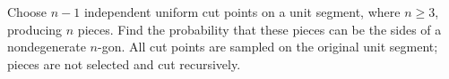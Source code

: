 Choose $n-1$ independent uniform cut points on a unit segment, where $n\ge3$, producing $n$ pieces. Find the probability that these pieces can be the sides of a nondegenerate $n$-gon. All cut points are sampled on the original unit segment; pieces are not selected and cut recursively.
